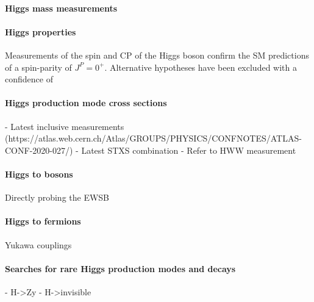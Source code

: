 
\paragraph{Higgs mass measurements}

\paragraph{Higgs properties}
Measurements of the spin and CP of the Higgs boson confirm the SM predictions of a spin-parity of $J^P = 0^+$. Alternative hypotheses have been excluded with a confidence of


\paragraph{Higgs production mode cross sections}
- Latest inclusive measurements (https://atlas.web.cern.ch/Atlas/GROUPS/PHYSICS/CONFNOTES/ATLAS-CONF-2020-027/)
- Latest STXS combination
- Refer to HWW measurement

\paragraph{Higgs to bosons}
Directly probing the EWSB

\paragraph{Higgs to fermions}
Yukawa couplings


\paragraph{Searches for rare Higgs production modes and decays}
- H->Zy
- H->invisible
